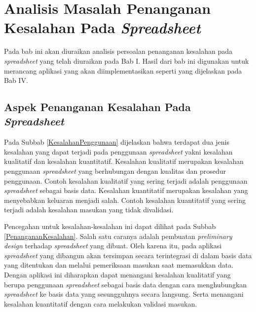 \chapter{Analisis Masalah Penanganan Kesalahan Pada \textit{Spreadsheet}}

Pada bab ini akan diuraikan analisis persoalan penanganan kesalahan pada \textit{spreadsheet} yang telah diuraikan pada Bab I. Hasil dari bab ini digunakan untuk merancang aplikasi yang akan diimplementasikan seperti yang dijelaskan pada Bab IV.

\section{Aspek Penanganan Kesalahan Pada \textit{Spreadsheet}} \label{AspekAplikasi}
Pada Subbab \ref{KesalahanPenggunaan} dijelaskan bahwa terdapat dua jenis kesalahan yang dapat terjadi pada penggunaan \textit{spreadsheet} yakni kesalahan kualitatif dan kesalahan kuantitatif. Kesalahan kualitatif merupakan kesalahan penggunaan \textit{spreadsheet} yang berhubungan dengan kualitas dan prosedur penggunaan. Contoh kesalahan kualitatif yang sering terjadi adalah penggunaan \textit{spreadsheet} sebagai basis data. Kesalahan kuantitatif merupakan kesalahan yang menyebabkan keluaran menjadi salah. Contoh kesalahan kuantitatif yang sering terjadi adalah kesalahan masukan yang tidak divalidasi.

Pencegahan untuk kesalahan-kesalahan ini dapat dilihat pada Subbab \ref{PenangananKesalahan}. Salah satu caranya adalah pembuatan \textit{preliminary design} terhadap \textit{spreadsheet} yang dibuat. Oleh karena itu, pada aplikasi \textit{spreadsheet} yang dibangun akan tersimpan secara terintegrasi di dalam basis data yang ditentukan dan melalui pemeriksaan masukan saat memasukkan data. Dengan aplikasi ini diharapkan dapat menangani kesalahan kualitatif yang berupa penggunaan \textit{spreadsheet} sebagai basis data dengan cara menghubungkan \textit{spreadsheet} ke basis data yang sesungguhnya secara langsung. Serta menangani kesalahan kuantitatif dengan cara melakukan validasi masukan. 

